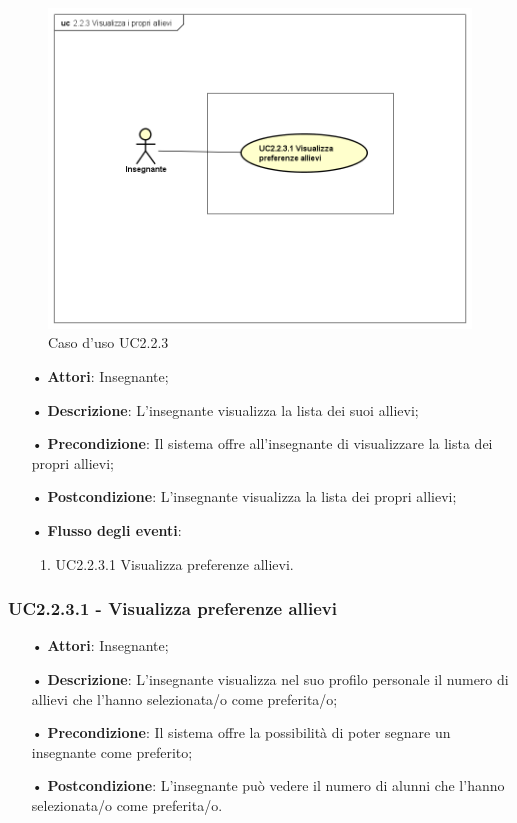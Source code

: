 \begin{figure}[H]
\centering
\includegraphics[width=17cm]{img/UC223.png} 
\caption{Caso d'uso UC2.2.3}
\end{figure}

\begin{itemize}
	\item[•] \textbf{Attori}: Insegnante;
	\item[•] \textbf{Descrizione}: L’insegnante visualizza la lista dei suoi allievi;
	\item[•] \textbf{Precondizione}: Il sistema offre all’insegnante di visualizzare la lista dei propri allievi;
	\item[•] \textbf{Postcondizione}: L’insegnante visualizza la lista dei propri allievi;
	\item[•] \textbf{Flusso degli eventi}:
		\begin{enumerate}
			\item UC2.2.3.1 Visualizza preferenze allievi.
		\end{enumerate}
\end{itemize}

\subsubsection{UC2.2.3.1 - Visualizza preferenze allievi}
\begin{itemize}
	\item[•] \textbf{Attori}: Insegnante;
	\item[•] \textbf{Descrizione}: L’insegnante visualizza nel suo profilo personale il numero di allievi che l'hanno selezionata/o come preferita/o;
	\item[•] \textbf{Precondizione}: Il sistema offre la possibilità di poter segnare un insegnante come preferito;
	\item[•] \textbf{Postcondizione}: L’insegnante può vedere il numero di alunni che l'hanno selezionata/o come preferita/o.
\end{itemize}


